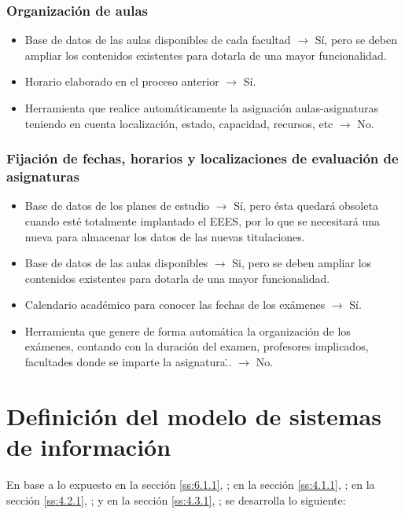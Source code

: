\documentclass[11pt,a4paper,spanish,twoside]{book}
\begin{document}
\subsubsection{Organización de aulas}
\begin{itemize}
\item Base de datos de las aulas disponibles de cada facultad $\to$ Sí, pero
  se deben ampliar los contenidos existentes para dotarla de una mayor
  funcionalidad. 
\item Horario elaborado en el proceso anterior $\to$ Sí.
\item  Herramienta que realice automáticamente la asignación
  aulas-asignaturas teniendo en cuenta localización, estado, capacidad,
  recursos, etc $\to$ No.
\end{itemize}

\subsubsection{Fijación de fechas, horarios y localizaciones de evaluación de
  asignaturas} 
\begin{itemize}
\item Base de datos de los planes de estudio $\to$ Sí, pero ésta quedará
  obsoleta cuando esté totalmente implantado el EEES, por lo que se
  necesitará una nueva para almacenar los datos de las nuevas titulaciones.  
\item Base de datos de las aulas disponibles $\to$ Si, pero se deben ampliar
  los contenidos existentes para dotarla de una mayor funcionalidad.
\item Calendario académico para conocer las fechas de los exámenes $\to$ Sí.
\item Herramienta que genere de forma automática la organización de los
    exámenes, contando con la duración del examen, profesores implicados,
    facultades donde se imparte la asignatura\... $\to$ No.
\end{itemize}

\section{Definición del modelo de sistemas de información}
En base a lo expuesto 
en la sección \vref{ss:6.1.1}, \emph{}; 
en la sección \vref{ss:4.1.1}, \emph{}; 
en la sección \vref{ss:4.2.1}, \emph{}; y
en la sección \vref{ss:4.3.1}, \emph{}; 
se desarrolla lo siguiente:
\end{document}
